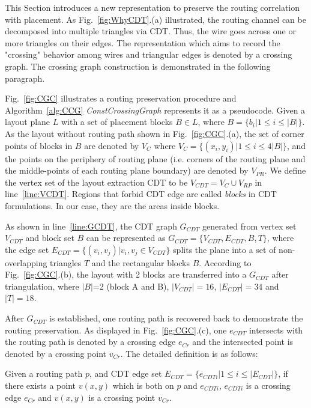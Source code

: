     This Section introduces a new representation to preserve the routing correlation with placement. As Fig.~\ref{fig:WhyCDT}.(a) illustrated, the routing channel can be decomposed into multiple triangles via CDT. Thus, the wire goes across one or more triangles on their edges. The representation which aims to record the "crossing" behavior among wires and triangular edges is denoted by a crossing graph. The crossing graph construction is demonstrated in the following paragraph. 


    Fig.~\ref{fig:CGC} illustrates a routing preservation procedure and Algorithm~\ref{alg:CCG} {\it ConstCrossingGraph} represents it as a pseudocode. Given a layout plane $L$ with a set of placement blocks $B \in L$, where $B = \{b_i|1 \leq i \leq |B|\}$. As the layout without routing path shown in Fig.~\ref{fig:CGC}.(a), the set of corner points of blocks in $B$ are denoted by $V_C$ where $V_C = \{(x_i,y_i)|1 \leq i \leq 4|B|\}$, and the points on the periphery of routing plane (i.e. corners of the routing plane and the middle-points of each routing plane boundary) are denoted by $V_{PR}$. We define the vertex set of the layout extraction CDT to be $V_{CDT} = V_C \cup V_{RP}$ in line~\ref{line:VCDT}. Regions that forbid CDT edge are called {\it blocks} in CDT formulations. In our case, they are the areas inside blocks.


    As shown in line~\ref{line:GCDT}, the CDT graph $G_{CDT}$ generated from vertex set $V_{CDT}$ and block set $B$ can be represented as $G_{CDT} = \{V_{CDT},E_{CDT},B,T\}$, where the edge set $E_{CDT} = \{(v_i,v_j)|v_i,v_j\in V_{CDT}\}$ splits the plane into a set of non-overlapping triangles $T$ and the rectangular blocks $B$. According to Fig.~\ref{fig:CGC}.(b), the layout with 2 blocks are transferred into a $G_{CDT}$ after triangulation, where $|B|$=2 (block A and B), $|V_{CDT}|=16$, $|E_{CDT}|=34$ and $|T|=18$.


    After $G_{CDT}$ is established, one routing path is recovered back to demonstrate the routing preservation. As displayed in Fig.~\ref{fig:CGC}.(c), one $e_{CDT}$ intersects with the routing path is denoted by a crossing edge $e_{Cr}$ and the intersected point is denoted by a crossing point $v_{Cr}$. The detailed definition is as follows:

     
    \begin{defi}\label{defi:CrossingPoint}
      Given a routing path $p$, and CDT edge set $E_{CDT}= \{e_{CDTi}| 1 \leq i\leq|E_{CDT}|\}$, if there exists a point $v(x,y)$ which is both on $p$ and $e_{CDTi}$, $e_{CDTi}$ is a crossing edge $e_{Cr}$ and $v(x,y)$ is a crossing point $v_{Cr}$.
    \end{defi}

